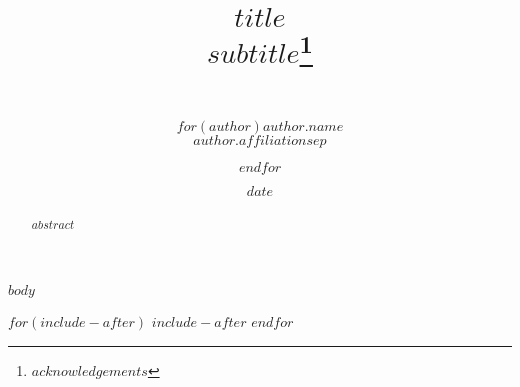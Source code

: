 \documentclass[a4paper, 1]{article}
\date{$date$}
\title{\LARGE{$title$}\\\Large{$subtitle$}\thanks{$acknowledgements$}\text{}\\ \text{}\\ }
\author{\onehalfspacing
  $for(author)$$author.name$\\$author.affiliation$$sep$ \and $endfor$
}
\theoremstyle{definition}
\theoremstyle{definition}
\theoremstyle{definition}
\theoremstyle{remark}
\begin{document}
\maketitle

\begin{abstract}
\noindent $abstract$
\end{abstract}

\clearpage
{}

$body$

$for(include-after)$
$include-after$
$endfor$
\end{document}
